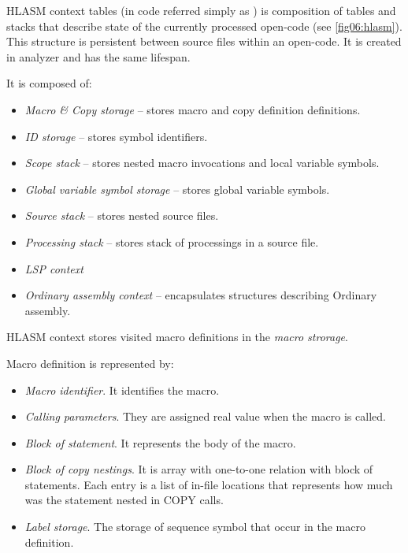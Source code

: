 HLASM context tables (in code referred simply as ) is composition of tables and stacks that describe state of the currently processed open-code (see \cref{fig06:hlasm}). This structure is persistent between source files within an open-code. It is created in analyzer and has the same lifespan. 

It is composed of:

\begin{itemize}
	\item \emph{Macro \& Copy storage} -- stores macro and copy definition definitions.
	\item \emph{ID storage} -- stores symbol identifiers.
	\item \emph{Scope stack} -- stores nested macro invocations and local variable symbols.
	\item \emph{Global variable symbol storage} -- stores global variable symbols.
	\item \emph{Source stack} -- stores nested source files.
	\item \emph{Processing stack} -- stores stack of processings in a source file.
	\item \emph{LSP context}
	\item \emph{Ordinary assembly context} -- encapsulates structures describing Ordinary assembly.
\end{itemize}

HLASM context stores visited macro definitions in the \emph{macro strorage}. 

Macro definition is represented by:
\begin{itemize}
	\item \emph{Macro identifier}. It identifies the macro.
	\item \emph{Calling parameters}. They are assigned real value when the macro is called.
	\item \emph{Block of statement}. It represents the body of the macro.
	\item \emph{Block of copy nestings}. It is array with one-to-one relation with block of statements. Each entry is a list of in-file locations that represents how much was the statement nested in COPY calls.
	\item \emph{Label storage}. The storage of sequence symbol that occur in the macro definition.
\end{itemize}

